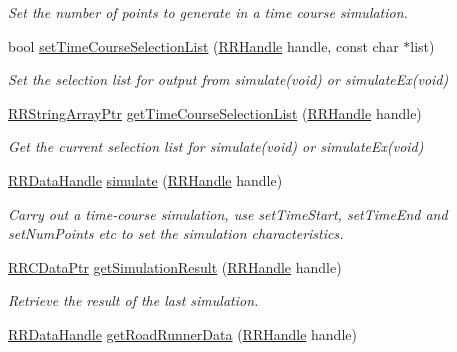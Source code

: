 \begin{DoxyCompactItemize}
\begin{DoxyCompactList}\small\item\em Set the number of points to generate in a time course simulation. \end{DoxyCompactList}\item 
bool \hyperlink{group__simulation_gabc78e3202e85470f1c0e380a8988fc9e}{set\-Time\-Course\-Selection\-List} (\hyperlink{rrc__types_8h_a1d68f0592372208fa5a5f2799ea4b3ae}{R\-R\-Handle} handle, const char $\ast$list)
\begin{DoxyCompactList}\small\item\em Set the selection list for output from simulate(void) or simulate\-Ex(void) \end{DoxyCompactList}\item 
\hyperlink{rrc__types_8h_a7c9475df6c7337d99482b13a365e7596}{R\-R\-String\-Array\-Ptr} \hyperlink{group__simulation_ga4c2ce3bcc97cbd6a5dcae423dfeeba0c}{get\-Time\-Course\-Selection\-List} (\hyperlink{rrc__types_8h_a1d68f0592372208fa5a5f2799ea4b3ae}{R\-R\-Handle} handle)
\begin{DoxyCompactList}\small\item\em Get the current selection list for simulate(void) or simulate\-Ex(void) \end{DoxyCompactList}\item 
\hyperlink{rrc__types_8h_ad0beb6fbdd576789fab9cead01d8b9e9}{R\-R\-Data\-Handle} \hyperlink{group__simulation_ga7631952c1a80ac25724bf67f7a7ddf7a}{simulate} (\hyperlink{rrc__types_8h_a1d68f0592372208fa5a5f2799ea4b3ae}{R\-R\-Handle} handle)
\begin{DoxyCompactList}\small\item\em Carry out a time-\/course simulation, use set\-Time\-Start, set\-Time\-End and set\-Num\-Points etc to set the simulation characteristics. \end{DoxyCompactList}\item 
\hyperlink{rrc__types_8h_a9da8b124eb9c3c0045f8926c6a420b4a}{R\-R\-C\-Data\-Ptr} \hyperlink{group__simulation_ga4c4bdc924e48c8e271e4654c6f40b3c8}{get\-Simulation\-Result} (\hyperlink{rrc__types_8h_a1d68f0592372208fa5a5f2799ea4b3ae}{R\-R\-Handle} handle)
\begin{DoxyCompactList}\small\item\em Retrieve the result of the last simulation. \end{DoxyCompactList}\item 
\hyperlink{rrc__types_8h_ad0beb6fbdd576789fab9cead01d8b9e9}{R\-R\-Data\-Handle} \hyperlink{group__simulation_gae6b70689ca3191f1a86a7e0c7a96d801}{get\-Road\-Runner\-Data} (\hyperlink{rrc__types_8h_a1d68f0592372208fa5a5f2799ea4b3ae}{R\-R\-Handle} handle)

\end{DoxyCompactItemize}
